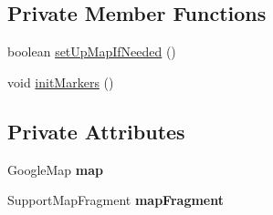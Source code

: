 \subsection*{Private Member Functions}
\begin{DoxyCompactItemize}
\item 
boolean \hyperlink{classcom_1_1qualoutdoor_1_1recorder_1_1map_1_1DataMapFragment_aec8e5d7ebd62ebda47d8bcb6469a45c4}{set\-Up\-Map\-If\-Needed} ()
\item 
void \hyperlink{classcom_1_1qualoutdoor_1_1recorder_1_1map_1_1DataMapFragment_ad61100353ce2562e4c09b00158e5a2ac}{init\-Markers} ()
\end{DoxyCompactItemize}
\subsection*{Private Attributes}
\begin{DoxyCompactItemize}
\item 
\hypertarget{classcom_1_1qualoutdoor_1_1recorder_1_1map_1_1DataMapFragment_a8818a618fb41bd86d8ba8735a87429c1}{Google\-Map {\bfseries map}}\label{classcom_1_1qualoutdoor_1_1recorder_1_1map_1_1DataMapFragment_a8818a618fb41bd86d8ba8735a87429c1}

\item 
\hypertarget{classcom_1_1qualoutdoor_1_1recorder_1_1map_1_1DataMapFragment_acd4640081a80fb7aff45ee8eacd41a26}{Support\-Map\-Fragment {\bfseries map\-Fragment}}\label{classcom_1_1qualoutdoor_1_1recorder_1_1map_1_1DataMapFragment_acd4640081a80fb7aff45ee8eacd41a26}

\end{DoxyCompactItemize}
